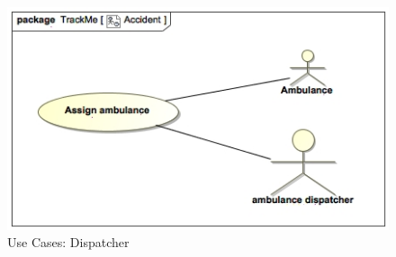 \documentclass[a4paper]{article}
\begin{document}
    	\begin{figure}[!htpb]
    	\centering
    	\includegraphics[width=\textwidth]{images/UML/Accident.jpg}
    	\caption{Use Cases: Dispatcher}
    	\end{figure}
        \newpage
        
        
\end{document}
